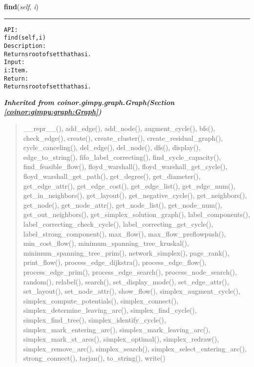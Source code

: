     \vspace{0.5ex}

\hspace{.8\funcindent}\begin{boxedminipage}{\funcwidth}

    \raggedright \textbf{find}(\textit{self}, \textit{i})

    \vspace{-1.5ex}

    \rule{\textwidth}{0.5\fboxrule}
\setlength{\parskip}{2ex}
\begin{alltt}

API:
    find(self, i)
Description:
    Returns root of set that has i.
Input:
    i: Item.
Return:
    Returns root of set that has i.
\end{alltt}

\setlength{\parskip}{1ex}
    \end{boxedminipage}


\large{\textbf{\textit{Inherited from coinor.gimpy.graph.Graph\textit{(Section \ref{coinor:gimpy:graph:Graph})}}}}

\begin{quote}
\_\_repr\_\_(), add\_edge(), add\_node(), augment\_cycle(), bfs(), check\_edge(), create(), create\_cluster(), create\_residual\_graph(), cycle\_canceling(), del\_edge(), del\_node(), dfs(), display(), edge\_to\_string(), fifo\_label\_correcting(), find\_cycle\_capacity(), find\_feasible\_flow(), floyd\_warshall(), floyd\_warshall\_get\_cycle(), floyd\_warshall\_get\_path(), get\_degree(), get\_diameter(), get\_edge\_attr(), get\_edge\_cost(), get\_edge\_list(), get\_edge\_num(), get\_in\_neighbors(), get\_layout(), get\_negative\_cycle(), get\_neighbors(), get\_node(), get\_node\_attr(), get\_node\_list(), get\_node\_num(), get\_out\_neighbors(), get\_simplex\_solution\_graph(), label\_components(), label\_correcting\_check\_cycle(), label\_correcting\_get\_cycle(), label\_strong\_component(), max\_flow(), max\_flow\_preflowpush(), min\_cost\_flow(), minimum\_spanning\_tree\_kruskal(), minimum\_spanning\_tree\_prim(), network\_simplex(), page\_rank(), print\_flow(), process\_edge\_dijkstra(), process\_edge\_flow(), process\_edge\_prim(), process\_edge\_search(), process\_node\_search(), random(), relabel(), search(), set\_display\_mode(), set\_edge\_attr(), set\_layout(), set\_node\_attr(), show\_flow(), simplex\_augment\_cycle(), simplex\_compute\_potentials(), simplex\_connect(), simplex\_determine\_leaving\_arc(), simplex\_find\_cycle(), simplex\_find\_tree(), simplex\_identify\_cycle(), simplex\_mark\_entering\_arc(), simplex\_mark\_leaving\_arc(), simplex\_mark\_st\_arcs(), simplex\_optimal(), simplex\_redraw(), simplex\_remove\_arc(), simplex\_search(), simplex\_select\_entering\_arc(), strong\_connect(), tarjan(), to\_string(), write()
\end{quote}

